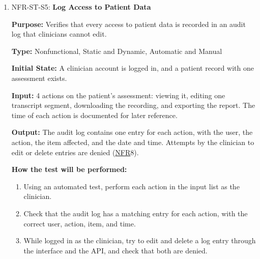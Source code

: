 \documentclass[12pt, titlepage]{article}
\newcommand{\srsnfr}[1]{\href{https://github.com/Nour-Fawaz/MacaBoca/blob/main/pdfs/SRS/SRS.pdf}{NFR}}
\renewcommand{\_}{\oldunderscore\allowbreak}
\begin{document}
\begin{enumerate}
  \item NFR-ST-S5: \textbf{Log Access to Patient Data\\}
  \begin{mdframed}[linewidth=0.5mm]
      \textbf{Purpose:} Verifies that every access to patient data is recorded in an audit log that clinicians cannot edit. \par
      \textbf{Type:} Nonfunctional, Static and Dynamic, Automatic and Manual \par
      \textbf{Initial State:} A clinician account is logged in, and a patient record with one assessment exists. \par
      \textbf{Input:} 4 actions on the patient's assessment: viewing it, editing one transcript segment, downloading the
       recording, and exporting the report. The time of each action is documented for later reference. \par
      \textbf{Output:} The audit log contains one entry for each action, with the user, the action, the item affected, and the date and time. 
      Attempts by the clinician to edit or delete entries are denied (\srsnfr*{8}). \par
      \textbf{How the test will be performed:}
      \begin{enumerate}
      \item[1.] Using an automated test, perform each action in the input list as the clinician.
      \item[2.] Check that the audit log has a matching entry for each action, with the correct user, action, item, and time.
      \item[3.] While logged in as the clinician, try to edit and delete a log entry through the interface and the API, and check that both are denied.
      \end{enumerate}
  \end{mdframed}
\end{enumerate}
\end{document}
